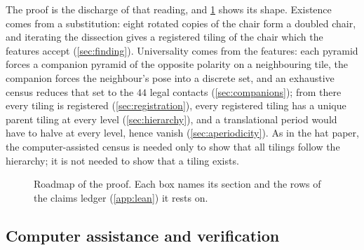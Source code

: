 The proof is the discharge of that reading, and \cref{fig:roadmap} shows its shape. Existence
comes from a substitution: eight rotated copies of the chair form a doubled chair, and iterating
the dissection gives a registered tiling of the chair which the features accept
(\cref{sec:finding}). Universality comes from the features: each pyramid forces a companion
pyramid of the opposite polarity on a neighbouring tile, the companion forces the neighbour's pose
into a discrete set, and an exhaustive census reduces that set to the $44$ legal contacts
(\cref{sec:companions}); from there every tiling is registered (\cref{sec:registration}), every
registered tiling has a unique parent tiling at every level (\cref{sec:hierarchy}), and a
translational period would have to halve at every level, hence vanish (\cref{sec:aperiodicity}).
As in the hat paper, the computer-assisted census is needed only to show that all tilings follow
the hierarchy; it is not needed to show that a tiling exists.

\begin{figure}[ht]
  \centering
  \resizebox{\linewidth}{!}{}
  \caption{Roadmap of the proof. Each box names its section and the rows of the claims ledger
  (\cref{app:lean}) it rests on.}
  \label{fig:roadmap}
\end{figure}

\subsection{Computer assistance and verification}\label{sec:computer}

